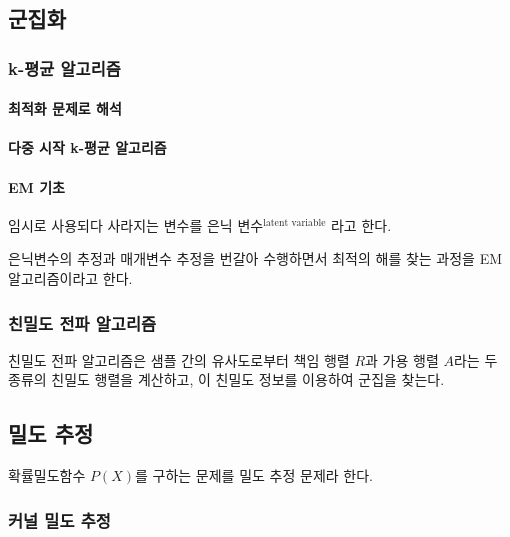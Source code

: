 \documentclass [12pt] {oblivoir}
\let\oldsubsubsection=\subsubsection
\renewcommand{\subsubsection}
{
  \filbreak
  \oldsubsubsection
}
\begin{document}
\subsection{군집화}

\subsubsection{k-평균 알고리즘}

\paragraph*{최적화 문제로 해석}\mbox{}

\vspace{3mm}

\paragraph*{다중 시작 k-평균 알고리즘}\mbox{}

\vspace{3mm}

\paragraph*{EM 기초}\mbox{}

임시로 사용되다 사라지는 변수를 은닉 변수$^{\text{latent variable}}$ 라고 한다.

\vspace{3mm}

은닉변수의 추정과 매개변수 추정을 번갈아 수행하면서 최적의 해를 찾는 과정을 EM 알고리즘이라고 한다.

\vspace{3mm}

\subsubsection{친밀도 전파 알고리즘}

친밀도 전파 알고리즘은 샘플 간의 유사도로부터 책임 행렬 $R$과 가용 행렬 $A$라는 두 종류의 친밀도 행렬을 계산하고, 이 친밀도 정보를 이용하여 군집을 찾는다.

\subsection{밀도 추정}

확률밀도함수 $P(X)$를 구하는 문제를 밀도 추정 문제라 한다.

\subsubsection{커널 밀도 추정}
\end{document}
